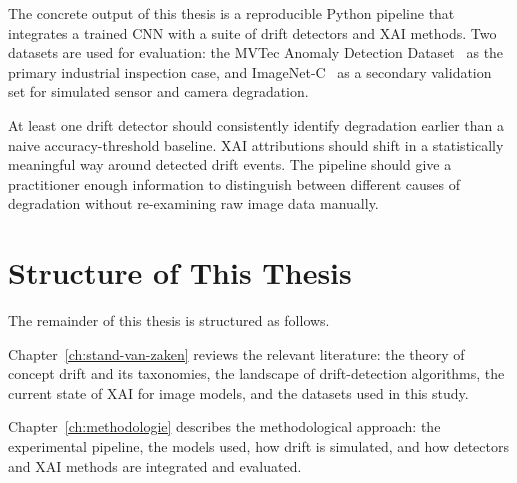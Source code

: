 The concrete output of this thesis is a reproducible Python pipeline that integrates a trained CNN with a suite of drift detectors and XAI methods. Two datasets are used for evaluation: the MVTec Anomaly Detection Dataset~\autocite{Bergmann2019} as the primary industrial inspection case, and ImageNet-C~\autocite{Hendrycks2019} as a secondary validation set for simulated sensor and camera degradation.

At least one drift detector should consistently identify degradation earlier than a naive accuracy-threshold baseline. XAI attributions should shift in a statistically meaningful way around detected drift events. The pipeline should give a practitioner enough information to distinguish between different causes of degradation without re-examining raw image data manually.

\section{Structure of This Thesis}%
\label{sec:opzet-bachelorproef}

The remainder of this thesis is structured as follows.

Chapter~\ref{ch:stand-van-zaken} reviews the relevant literature: the theory of concept drift and its taxonomies, the landscape of drift-detection algorithms, the current state of XAI for image models, and the datasets used in this study.

Chapter~\ref{ch:methodologie} describes the methodological approach: the experimental pipeline, the models used, how drift is simulated, and how detectors and XAI methods are integrated and evaluated.

